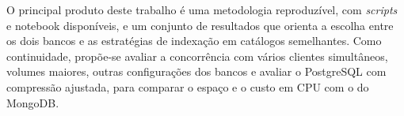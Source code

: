 O principal produto deste trabalho é uma metodologia reproduzível, com \textit{scripts}
e notebook disponíveis, e um conjunto de resultados que orienta a escolha entre os
dois bancos e as estratégias de indexação em catálogos semelhantes. Como
continuidade, propõe-se avaliar a concorrência com vários clientes simultâneos,
volumes maiores, outras configurações dos bancos e avaliar o PostgreSQL com compressão ajustada, para comparar o espaço e o custo em CPU com o do MongoDB.